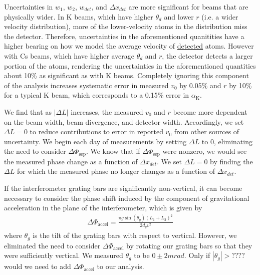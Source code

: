 \documentclass[twocolumn,prl,showpacs,superscriptaddress]{revtex4-1}   %
\newcommand{\ak}{\alpha_{\textrm{K}}}
\newcommand{\dphisep}{\Delta\Phi_{\mathrm{sep}}}
\newcommand{\dphiaccel}{\Delta\Phi_{\mathrm{accel}}}
\begin{document}
Uncertainties in $w_1$, $w_2$, $w_{det}$, and $\Delta x_{det}$ are more significant for beams that are physically wider. 
In K beams, which have higher $\theta_d$ and lower $r$ (i.e. a wider velocity distribution), more of the lower-velocity atoms in the distribution miss the detector. Therefore, uncertainties in the aforementioned quanitities have a higher bearing on how we model the average velocity of \underline{detected} atoms. However with Cs beams, which have higher average $\theta_d$ and $r$, the detector detects a larger portion of the atoms, rendering the uncertainties in the aforementioned quantities about 10\% as significant as with K beams.
Completely ignoring this component of the analysis increases systematic error in measured $v_0$ by 0.05\% and $r$ by 10\% for a typical K beam, which corresponds to a 0.15\% error in $\ak$.
 
We find that as $\left|\Delta L\right|$ increases, the measured $v_0$ and $r$ become more dependent on the beam width, beam divergence, and detector width. Accordingly, we set $\Delta L = 0$ to reduce contributions to error in reported $v_0$ from other sources of uncertainty. We begin each day of measurements by setting $\Delta L$ to 0, eliminating the need to consider $\dphisep$. We know that if $\dphisep$ were nonzero, we would see the measured phase change as a function of $\Delta x_{det}$. We set $\Delta L = 0$ by finding the $\Delta L$ for which the measured phase no longer changes as a function of $\Delta x_{det}$.

If the interferometer grating bars are significantly non-vertical, it can become necessary to consider the phase shift induced by the component of gravitational acceleration in the plane of the interferometer, which is given by
\begin{align}
	\dphiaccel = \frac{\pi g\sin({\theta_g})(L_1+L_2)^2}{2d_g v^2}
	\label{phiAccel}
\end{align}
where $\theta_g$ is the tilt of the grating bars with respect to vertical. However, we eliminated the need to consider $\dphiaccel$ by rotating our grating bars so that they were sufficiently vertical. We measured $\theta_g$ to be $0 \pm 2 mrad$. Only if $|\theta_g| > ????$ would we need to add $\dphiaccel$ to our analysis.
\end{document}
